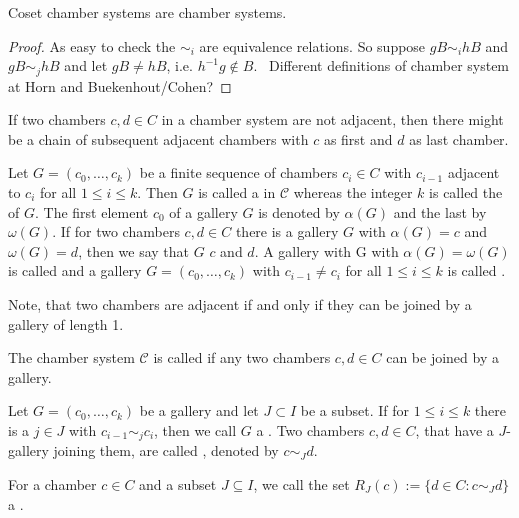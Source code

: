 \begin{lemm}
	Coset chamber systems are chamber systems.

	\begin{proof}
		As easy to check the $\sim_i$ are equivalence relations. So suppose $gB \sim_i hB$ and $gB \sim_j hB$ and let $gB \neq hB$, i.e. $h^{-1}g \notin B$. \todo \ Different definitions of chamber system at Horn and Buekenhout/Cohen?
	\end{proof}
\end{lemm}


If two chambers $c,d \in C$ in a chamber system are not adjacent, then there might be a chain of subsequent adjacent chambers with $c$ as first and $d$ as last chamber.

\begin{defi}
	Let $G = (c_0,\ldots,c_k)$ be a finite sequence of chambers $c_i \in C$ with $c_{i-1}$ adjacent to $c_i$ for all $1 \leq i \leq k$. Then $G$ is called a  in $\mathcal{C}$ whereas the integer $k$ is called the  of $G$. The first element $c_0$ of a gallery $G$ is denoted by $\alpha(G)$ and the last by $\omega(G)$. If for two chambers $c,d \in C$ there is a gallery $G$ with $\alpha(G) = c$ and $\omega(G) = d$, then we say that $G$  $c$ and $d$. A gallery with G with $\alpha(G) = \omega(G)$ is called  and a gallery $G = (c_0,\ldots,c_k)$ with $c_{i-1} \neq c_i$ for all $1 \leq i \leq k$ is called .
\end{defi}

Note, that two chambers are adjacent if and only if they can be joined by a gallery of length 1.

\begin{defi}
	The chamber system $\mathcal{C}$ is called  if any two chambers $c,d \in C$ can be joined by a gallery.
\end{defi}

\begin{defi}
	Let $G = (c_0,\ldots,c_k)$ be a gallery and let $J \subset I$ be a subset. If for $1 \leq i \leq k$ there is a $j \in J$ with $c_{i-1} \sim_j c_i$, then we call $G$ a . Two chambers $c,d \in C$, that have a $J$-gallery joining them, are called , denoted by $c \sim_J d$.
\end{defi}

\begin{defi}
	For a chamber $c \in C$ and a subset $J \subseteq I$, we call the set $R_J(c) := \{ d \in C : c \sim_J d \}$ a .
\end{defi}

